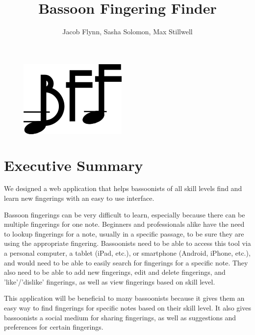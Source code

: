 \documentclass[12pt,english]{article}
\begin{document}
\title{Bassoon Fingering Finder}


\author{Jacob Flynn, Sasha Solomon, Max Stillwell}

\maketitle
\begin{center}
\begin{figure}


\begin{centering}
\includegraphics{bff_logo1_small}
\par\end{centering}

\end{figure}

\par\end{center}

\pagebreak{}

\tableofcontents{}\clearpage{}


\section{Executive Summary}

We designed a web application that helps bassoonists of all skill
levels find and learn new fingerings with an easy to use interface.

Bassoon fingerings can be very difficult to learn, especially because
there can be multiple fingerings for one note. Beginners and professionals
alike have the need to lookup fingerings for a note, usually in a
specific passage, to be sure they are using the appropriate fingering.
Bassoonists need to be able to access this tool via a personal computer,
a tablet (iPad, etc.), or smartphone (Android, iPhone, etc.), and
would need to be able to easily search for fingerings for a specific
note. They also need to be able to add new fingerings, edit and delete
fingerings, and 'like'/'dislike' fingerings, as well as view fingerings
based on skill level.

This application will be beneficial to many bassoonists because it
gives them an easy way to find fingerings for specific notes based
on their skill level. It also gives bassoonists a social medium for
sharing fingerings, as well as suggestions and preferences for certain
fingerings.
\end{document}
